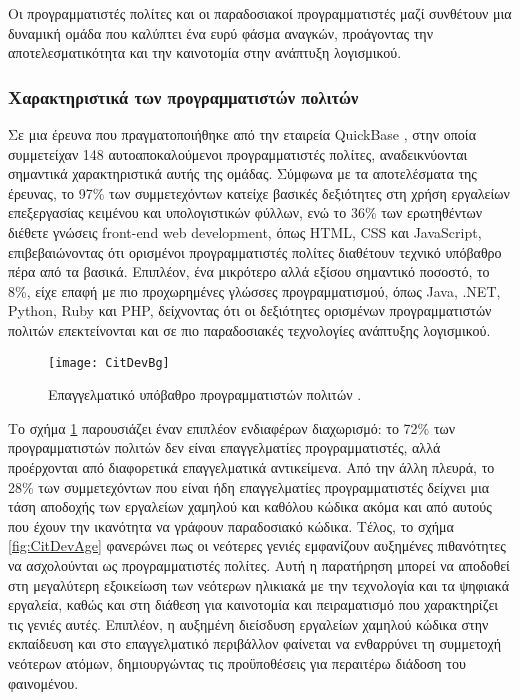                     Οι προγραμματιστές πολίτες και οι παραδοσιακοί προγραμματιστές μαζί συνθέτουν μια δυναμική ομάδα που καλύπτει ένα ευρύ φάσμα αναγκών, προάγοντας την αποτελεσματικότητα και την καινοτομία στην ανάπτυξη λογισμικού.

                \subsubsection{Χαρακτηριστικά των προγραμματιστών πολιτών}
                    Σε μια έρευνα που πραγματοποιήθηκε από την εταιρεία QuickBase \cite{QuickBaseCitizenDevReport}, στην οποία συμμετείχαν 148 αυτοαποκαλούμενοι προγραμματιστές πολίτες, αναδεικνύονται σημαντικά χαρακτηριστικά αυτής της ομάδας. Σύμφωνα με τα αποτελέσματα της έρευνας, το 97\% των συμμετεχόντων κατείχε βασικές δεξιότητες στη χρήση εργαλείων επεξεργασίας κειμένου και υπολογιστικών φύλλων, ενώ το 36\% των ερωτηθέντων διέθετε γνώσεις front-end web development, όπως HTML, CSS και JavaScript, επιβεβαιώνοντας ότι ορισμένοι προγραμματιστές πολίτες διαθέτουν τεχνικό υπόβαθρο πέρα από τα βασικά. Επιπλέον, ένα μικρότερο αλλά εξίσου σημαντικό ποσοστό, το 8\%, είχε επαφή με πιο προχωρημένες γλώσσες προγραμματισμού, όπως Java, .NET, Python, Ruby και PHP, δείχνοντας ότι οι δεξιότητες ορισμένων προγραμματιστών πολιτών επεκτείνονται και σε πιο παραδοσιακές τεχνολογίες ανάπτυξης λογισμικού.

                    \begin{figure}[h!] \noindent \centering
                        \texttt{[image: CitDevBg]}
                        \caption{Επαγγελματικό υπόβαθρο προγραμματιστών πολιτών \cite{LowCodeSimon}.}
                        \label{fig:CitDevBg}
                    \end{figure}

                    Το σχήμα \ref{fig:CitDevBg} παρουσιάζει έναν επιπλέον ενδιαφέρων διαχωρισμό: το 72\% των προγραμματιστών πολιτών δεν είναι επαγγελματίες προγραμματιστές, αλλά προέρχονται από διαφορετικά επαγγελματικά αντικείμενα. Από την άλλη πλευρά, το 28\% των συμμετεχόντων που είναι ήδη επαγγελματίες προγραμματιστές δείχνει μια τάση αποδοχής των εργαλείων χαμηλού και καθόλου κώδικα ακόμα και από αυτούς που έχουν την ικανότητα να γράφουν παραδοσιακό κώδικα. Τέλος, το σχήμα \ref{fig:CitDevAge} φανερώνει πως οι νεότερες γενιές εμφανίζουν αυξημένες πιθανότητες να ασχολούνται ως προγραμματιστές πολίτες. Αυτή η παρατήρηση μπορεί να αποδοθεί στη μεγαλύτερη εξοικείωση των νεότερων ηλικιακά με την τεχνολογία και τα ψηφιακά εργαλεία, καθώς και στη διάθεση για καινοτομία και πειραματισμό που χαρακτηρίζει τις γενιές αυτές. Επιπλέον, η αυξημένη διείσδυση εργαλείων χαμηλού κώδικα στην εκπαίδευση και στο επαγγελματικό περιβάλλον φαίνεται να ενθαρρύνει τη συμμετοχή νεότερων ατόμων, δημιουργώντας τις προϋποθέσεις για περαιτέρω διάδοση του φαινομένου.

